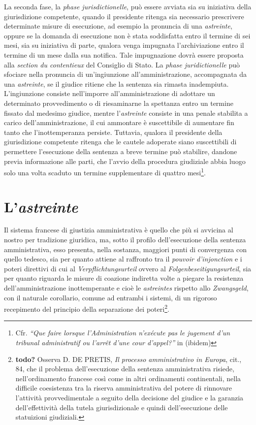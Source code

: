 \documentclass[12pt,it,a4paper,]{report}
\begin{document}
La seconda fase, la \emph{phase jurisdictionelle}, può essere avviata
sia su iniziativa della giurisdizione competente, quando il presidente
ritenga sia necessario prescrivere determinate misure di esecuzione, ad
esempio la pronuncia di una \emph{astreinte}, oppure se la domanda di
esecuzione non è stata soddisfatta entro il termine di sei mesi, sia su
iniziativa di parte, qualora venga impugnata l'archiviazione entro il
termine di un mese dalla sua notifica. Tale impugnazione dovrà essere
proposta alla \emph{section du contentieux} del Consiglio di Stato. La
\emph{phase juridictionelle} può sfociare nella pronuncia di
un'ingiunzione all'amministrazione, accompagnata da una
\emph{astreinte}, se il giudice ritiene che la sentenza sia rimasta
inadempiuta. L'ingiunzione consiste nell'imporre all'amministrazione di
adottare un determinato provvedimento o di riesaminarne la spettanza
entro un termine fissato dal medesimo giudice, mentre l'\emph{astreinte}
consiste in una penale stabilita a carico dell'amministrazione, il cui
ammontare è suscettibile di aumentare fin tanto che l'inottemperanza
persiste. Tuttavia, qualora il presidente della giurisdizione competente
ritenga che le cautele adoperate siano suscettibili di permettere
l'esecuzione della sentenza a breve termine può stabilire, dandone
previa informazione alle parti, che l'avvio della procedura giudiziale
abbia luogo solo una volta scaduto un termine supplementare di quattro
mesi\footnote{Cfr. \emph{``Que faire lorsque l'Administration n'exécute
  pas le jugement d'un tribunal administratif ou l'arrêt d'une cour
  d'appel?''} in (ibidem)}.

\hypertarget{lastreinte}{%
\section{\texorpdfstring{L'\emph{astreinte}}{L'astreinte}}\label{lastreinte}}

Il sistema francese di giustizia amministrativa è quello che più si
avvicina al nostro per tradizione giuridica, ma, sotto il profilo
dell'esecuzione della sentenza amministrativa, esso presenta, nella
sostanza, maggiori punti di convergenza con quello tedesco, sia per
quanto attiene al raffronto tra il \emph{pouvoir d'injonction} e i
poteri direttivi di cui al \emph{Verpflichtungsurteil} ovvero al
\emph{Folgenbeseitigungsurteil}, sia per quanto riguarda le misure di
coazione indiretta volte a piegare la resistenza dell'amministrazione
inottemperante e cioè le \emph{astreintes} rispetto allo
\emph{Zwangsgeld}, con il naturale corollario, comune ad entrambi i
sistemi, di un rigoroso recepimento del principio della separazione dei
poteri\footnote{\textbf{todo?} Osserva D. DE PRETIS, \emph{Il processo
  amministrativo in Europa}, cit., 84, che il problema dell'esecuzione
  della sentenza amministrativa risiede, nell'ordinamento francese così
  come in altri ordinamenti continentali, nella difficile coesistenza
  tra la riserva amministrativa del potere di rinnovare l'attività
  provvedimentale a seguito della decisione del giudice e la garanzia
  dell'effettività della tutela giurisdizionale e quindi dell'esecuzione
  delle statuizioni giudiziali.}.
\end{document}
